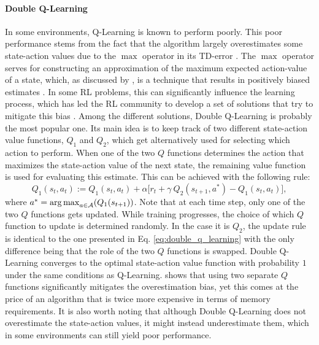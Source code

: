 \paragraph{\textbf{\uppercase{D}ouble \uppercase{Q}-\uppercase{L}earning}} In some environments, Q-Learning is known to perform poorly. This poor performance stems from the fact that the algorithm largely overestimates some state-action values due to the $\max$ operator in its TD-error \cite{thrun1993issues}. The $\max$ operator serves for constructing an approximation of the maximum expected action-value of a state, which, as discussed by \citet{hasselt2010double}, is a technique that results in positively biased estimates \cite{van2004rational,smith2006optimizer}. In some RL problems, this can significantly influence the learning process, which has led the RL community to develop a set of solutions that try to mitigate this bias \cite{lee2013bias,lee2019bias,zhu2020self,pentaliotis2021variation}. Among the different solutions, Double Q-Learning \cite{hasselt2010double} is probably the most popular one. Its main idea is to keep track of two different state-action value functions, $Q_1$ and $Q_2$, which get alternatively used for selecting which action to perform. When one of the two $Q$ functions determines the action that maximizes the state-action value of the next state, the remaining value function is used for evaluating this estimate. This can be achieved with the following rule:
\begin{equation}
	Q_1(s_t,a_t):=Q_1(s_t,a_t) + \alpha\big[r_t + \gamma \: Q_2(s_{t+1},a^{*}) - Q_1(s_t, a_t) \big],
\label{eq:double_q_learning}
\end{equation}
where $a^{*}=\operatorname*{arg\,max}_{a\in \mathcal{A}}(Q_1(s_{t+1}))$. Note that at each time step, only one of the two $Q$ functions gets updated. While training progresses, the choice of which $Q$ function to update is determined randomly. In the case it is $Q_2$, the update rule is identical to the one presented in Eq. \ref{eq:double_q_learning} with the only difference being that the role of the two $Q$ functions is swapped. Double Q-Learning converges to the optimal state-action value function with probability $1$ under the same conditions as Q-Learning. \citet{hasselt2010double} shows that using two separate $Q$ functions significantly mitigates the overestimation bias, yet this comes at the price of an algorithm that is twice more expensive in terms of memory requirements. It is also worth noting that although Double Q-Learning does not overestimate the state-action values, it might instead underestimate them, which in some environments can still yield poor performance.


